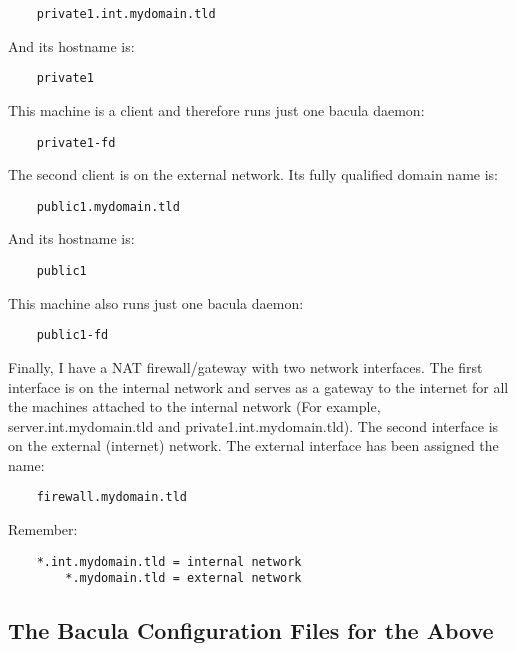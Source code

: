\footnotesize
\begin{verbatim}
    private1.int.mydomain.tld
\end{verbatim}
\normalsize

And its hostname is: 

\footnotesize
\begin{verbatim}
    private1
\end{verbatim}
\normalsize

This machine is a client and therefore runs just one bacula daemon: 

\footnotesize
\begin{verbatim}
    private1-fd
\end{verbatim}
\normalsize

The second client is on the external network. Its fully qualified domain name
is: 

\footnotesize
\begin{verbatim}
    public1.mydomain.tld
\end{verbatim}
\normalsize

And its hostname is: 

\footnotesize
\begin{verbatim}
    public1
\end{verbatim}
\normalsize

This machine also runs just one bacula daemon: 

\footnotesize
\begin{verbatim}
    public1-fd
\end{verbatim}
\normalsize

Finally, I have a NAT firewall/gateway with two network interfaces. The first
interface is on the internal network and serves as a gateway to the internet
for all the machines attached to the internal network (For example,
server.int.mydomain.tld and private1.int.mydomain.tld). The second interface
is on the external (internet) network. The external interface has been
assigned the name: 

\footnotesize
\begin{verbatim}
    firewall.mydomain.tld
\end{verbatim}
\normalsize

Remember: 

\footnotesize
\begin{verbatim}
    *.int.mydomain.tld = internal network
        *.mydomain.tld = external network
\end{verbatim}
\normalsize

\subsection{The Bacula Configuration Files for the Above}

